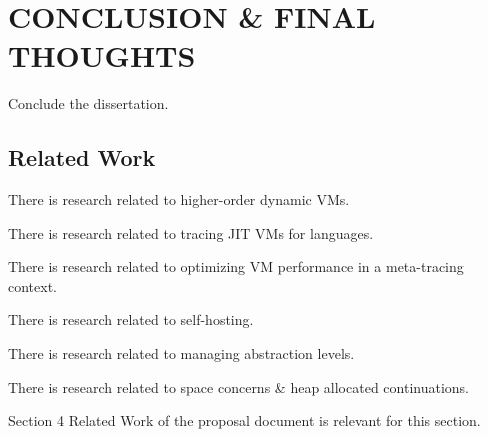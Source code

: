 \chapter[\texorpdfstring{CONCLUSION \& FINAL THOUGHTS}
                          {Conclusion \& Final Thoughts}]{CONCLUSION \& FINAL THOUGHTS}

    \begin{chaptersynopsis}
        Conclude the dissertation.
    \end{chaptersynopsis}

    \section{Related Work}
        \label{section:related-work}

        \begin{mainpoint}
            There is research related to higher-order dynamic VMs.

            There is research related to tracing JIT VMs for languages.

            There is research related to optimizing VM performance in a meta-tracing context.

            There is research related to self-hosting.

            There is research related to managing abstraction levels.

            There is research related to space concerns \& heap allocated continuations.

        \end{mainpoint}

        \begin{todo}[Import]
            Section 4 Related Work of the proposal document is relevant for this section.
        \end{todo}

